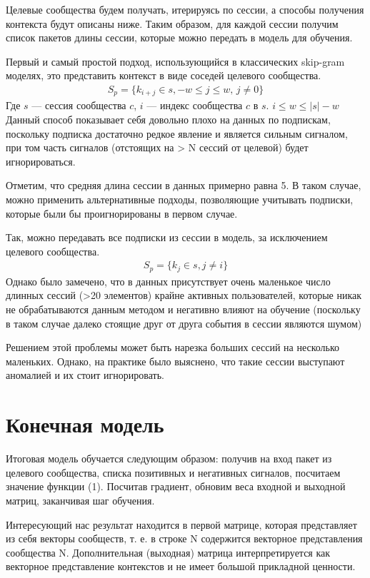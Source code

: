 \documentclass[times,specification,annotation]{itmo-student-thesis}
\begin{document}
Целевые сообщества будем получать, итерируясь по сессии, а способы
получения контекста будут описаны ниже. Таким образом, для каждой сессии
получим список пакетов длины сессии, которые можно передать в модель для
обучения.

Первый и самый простой подход, использующийся в классических skip-gram моделях, это представить контекст в виде соседей целевого сообщества. 
\begin{align}
S_p =\{k_{i + j} \in s, -w \leq j \leq w,\, j \ne 0\} \label{eq4}
\end{align}
Где $s$ --- сессия сообщества $c$, $i$ --- индекс сообщества $c$ в $s$. $i \leq w \leq |s| - w$
Данный
способ показывает себя довольно плохо на данных по подпискам, поскольку подписка
достаточно редкое явление и является сильным сигналом, при том часть сигналов
(отстоящих на > N сессий от целевой) будет игнорироваться.

Отметим, что средняя длина сессии в данных примерно равна 5. В таком случае, можно применить альтернативные подходы, позволяющие учитывать подписки, которые были бы проигнорированы в первом случае.  

Так, можно передавать все подписки из сессии в модель, за исключением целевого сообщества.
\begin{align*}
S_p =\{k_j \in s, j \ne i\}
\end{align*}
Однако было замечено, что в данных присутствует очень маленькое число длинных сессий (>20 элементов) крайне активных пользователей, которые никак не обрабатываются данным методом и негативно
влияют на обучение (поскольку в таком случае далеко стоящие друг от друга
события в сессии являются шумом)

Решением этой проблемы может быть нарезка больших
сессий на несколько маленьких. Однако, на практике было выяснено, что такие сессии выступают аномалией и их стоит игнорировать. 

\section{Конечная модель}

Итоговая модель обучается следующим образом: получив на вход пакет из
целевого сообщества, списка позитивных и негативных сигналов, посчитаем
значение функции (1). Посчитав градиент, обновим веса входной и выходной
матриц, заканчивая шаг обучения.

Интересующий нас результат находится в первой матрице, которая
представляет из себя векторы сообществ, т. е. в строке N содержится векторное
представления сообщества N. Дополнительная (выходная) матрица
интерпретируется как векторное представление контекстов и не имеет большой
прикладной ценности.
\end{document}
